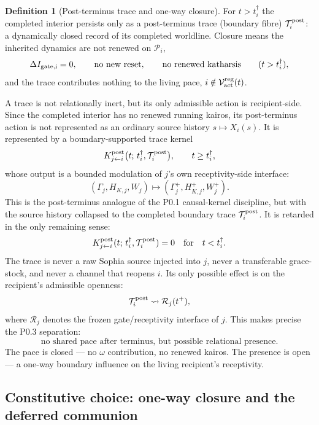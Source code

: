 \documentclass[11pt,a4paper]{article}
\def\emph#1{#1}%
\theoremstyle{definition}
\newtheorem{definition}{Definition}[section]
\theoremstyle{plain}
\theoremstyle{remark}
\begin{document}
\begin{definition}[Post-terminus trace and one-way closure]\label{def:trace}
For \(t>t_i^\dagger\) the completed interior persists only as a \emph{post-terminus
trace} (boundary fibre) \(\mathcal T_i^{\rm post}\): a dynamically closed record of its
completed worldline. Closure means the inherited dynamics are not renewed on
\(\mathcal P_i\),
\[
\Delta I_{\rm gate,i}=0,\qquad
\text{no new reset},\qquad
\text{no renewed katharsis}
\qquad(t>t_i^\dagger),
\]
and the trace contributes nothing to the living pace,
\(i\notin\mathcal V_{\rm act}^{\rm reg}(t)\).
\end{definition}

A trace is not relationally inert, but its only admissible action is
recipient-side. Since the completed interior has no renewed running kairos, its
post-terminus action is not represented as an ordinary source history
\(s\mapsto X_i(s)\). It is represented by a boundary-supported trace kernel
\[
K^{\rm post}_{j\leftarrow i}
\bigl(t;\,t_i^\dagger,\mathcal T_i^{\rm post}\bigr),
\qquad
t\geq t_i^\dagger,
\]
whose output is a bounded modulation of \(j\)'s own receptivity-side interface:
\[
(\Gamma_j,H_{K,j},W_j)
\longmapsto
(\Gamma_j^+,H_{K,j}^+,W_j^+).
\]
This is the post-terminus analogue of the P0.1 causal-kernel discipline, but with
the source history collapsed to the completed boundary trace
\(\mathcal T_i^{\rm post}\). It is retarded in the only remaining sense:
\[
K^{\rm post}_{j\leftarrow i}(t;\,t_i^\dagger,\mathcal T_i^{\rm post})=0
\quad\text{for}\quad
t<t_i^\dagger.
\]
The trace is never a raw Sophia source injected into \(j\), never a transferable
grace-stock, and never a channel that reopens \(i\). Its only possible effect is on
the recipient's admissible openness:
\[
\mathcal T_i^{\rm post}
\leadsto
\mathcal R_j(t^+),
\]
where \(\mathcal R_j\) denotes the frozen gate/receptivity interface of \(j\). This
makes precise the P0.3 separation:
\[
\boxed{\text{no shared pace after terminus, but possible relational presence.}}
\]
The pace is closed --- no \(\omega\) contribution, no renewed kairos. The presence is
open --- a one-way boundary influence on the living recipient's receptivity.

\subsection{Constitutive choice: one-way closure and the deferred communion}
\end{document}
